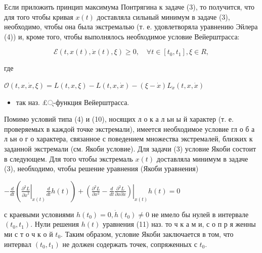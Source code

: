 \documentclass[10pt]{article}
\begin{document}
Если приложить принцип максимума Понтрягина к задаче (3), то получится, что для того чтобы кривая $x(t)$ доставляла сильный минимум в задаче (3), необходимо, чтобы она была экстремалью (т. е. удовлетворяла уравнению Эйлера (4)) и, кроме того, чтобы выполнялось необходимое условие Вейерштрасса:



\[

\mathscr{E}(t, x(t), \dot{x}(t), \xi) \geqslant 0, \quad \forall t \in\left[t_{0}, t_{1}\right], \xi \in R,

\]



где



$\mathscr{O}(t, x, \dot{x}, \xi)=L(t, x, \xi)-L(t, x, \dot{x})-(\xi-\dot{x}) L_{\dot{x}}(t, x, \dot{x})$



\begin{itemize}

  \item так наз. £्-функция Вейерштрасса.

\end{itemize}



Помимо условий типа (4) и (10), носящих л о к а л ьн ы й характер (т. е. проверяемых в каждой точке экстремали), имеется необходимое условие гл о б а л ьн о г о характера, связанное с поведением множества экстремалей, близких к заданной экстремали (см. Якоби условие). Для задачи (3) условие Якоби состоит в следующем. Для того чтобы экстремаль $x(t)$ доставляла минимум в задаче (3), необходимо, чтобы решение уравнения (Якоби уравнения)



$-\frac{d}{d t}\left(\left.\frac{\partial^{2} L}{\partial \dot{x}^{2}}\right|_{x(t)} \frac{d}{d t} h(t)\right)+\left.\left(\frac{\partial^{2} L}{\partial x^{2}}-\frac{d}{d t} \frac{\partial^{2} L}{\partial x \partial \dot{x}}\right)\right|_{x(t)} h(t)=0$



с краевыми условиями $h\left(t_{0}\right)=0, \dot{h}\left(t_{0}\right) \neq 0$ не имело бы нулей в интервале $\left(t_{0}, t_{1}\right)$. Нули решения $h(t)$ уравнения (11) наз. то ч к а м и, с о п р я женны ми с т о ч к о й $t_{0}$. Таким образом, условие Якоби заключается в том, что интервал $\left(t_{0}, t_{1}\right)$ не должен содержать точек, сопряженных с $t_{0}$.
\end{document}
